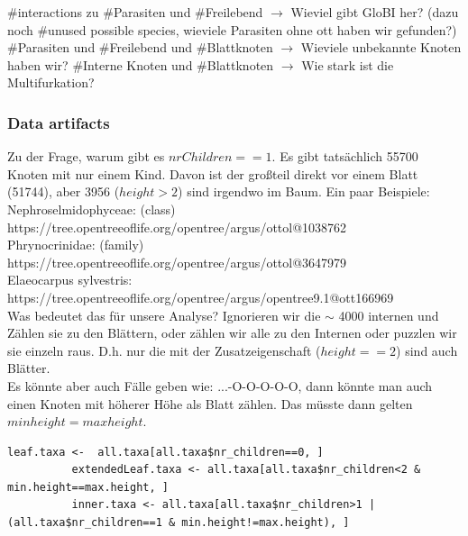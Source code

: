       \#interactions zu \#Parasiten und \#Freilebend $\rightarrow$ Wieviel gibt GloBI her? (dazu noch 
        \#unused possible species, wieviele Parasiten ohne ott haben wir gefunden?)
      \#Parasiten und \#Freilebend und \#Blattknoten $\rightarrow$ Wieviele unbekannte Knoten haben wir?
      \#Interne Knoten und \#Blattknoten $\rightarrow$ Wie stark ist die Multifurkation?

      \subsubsection{Data artifacts}
        Zu der Frage, warum gibt es $nrChildren==1$. Es gibt tatsächlich 55700 Knoten mit nur einem Kind. 
          Davon ist der großteil direkt vor einem Blatt (51744), aber 3956 ($height >2$) sind irgendwo im 
          Baum. Ein paar Beispiele: \\
        Nephroselmidophyceae: (class) \\
        https://tree.opentreeoflife.org/opentree/argus/ottol@1038762 \\
        Phrynocrinidae: (family) \\
        https://tree.opentreeoflife.org/opentree/argus/ottol@3647979 \\
        Elaeocarpus sylvestris: \\
        https://tree.opentreeoflife.org/opentree/argus/opentree9.1@ott166969 \\
        Was bedeutet das für unsere Analyse? Ignorieren wir die $\sim$ 4000 internen und Zählen sie zu den 
          Blättern, oder zählen wir alle zu den Internen oder puzzlen wir sie einzeln raus. D.h. nur die 
          mit der Zusatzeigenschaft ($height == 2$) sind auch Blätter. \\
        Es könnte aber auch Fälle geben wie: ...-O-O-O-O-O, dann könnte man auch einen Knoten mit höherer 
          Höhe als Blatt zählen. Das müsste dann gelten $min height = max height$. \\ 
        \begin{lstlisting}[gobble=8]
          leaf.taxa <-  all.taxa[all.taxa$nr_children==0, ]
          extendedLeaf.taxa <- all.taxa[all.taxa$nr_children<2 & min.height==max.height, ]
          inner.taxa <- all.taxa[all.taxa$nr_children>1 | (all.taxa$nr_children==1 & min.height!=max.height), ]
        \end{lstlisting}

